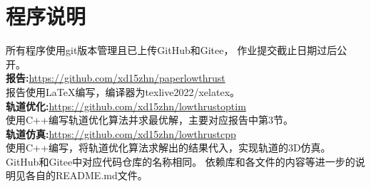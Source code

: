 \section{程序说明}
所有程序使用git版本管理且已上传GitHub和Gitee，
作业提交截止日期过后公开。\\
\textbf{报告:}\url{https://github.com/xd15zhn/paperlowthrust} \\
报告使用\LaTeX 编写，编译器为texlive2022/xelatex。\\
\textbf{轨道优化:}\url{https://github.com/xd15zhn/lowthrustoptim} \\
使用C++编写轨道优化算法并求最优解，主要对应报告中第3节。\\
\textbf{轨道仿真:}\url{https://github.com/xd15zhn/lowthrustcpp} \\
使用C++编写，将轨道优化算法求解出的结果代入，实现轨道的3D仿真。\\
GitHub和Gitee中对应代码仓库的名称相同。
依赖库和各文件的内容等进一步的说明见各自的README.md文件。
